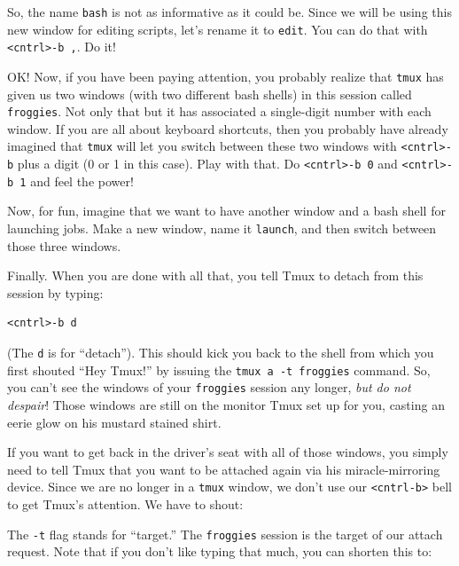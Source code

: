 \documentclass[]{krantz}
\makeatletter
\newenvironment{Shaded}{\begin{snugshade}}{\end{snugshade}}
\newcommand{\ExtensionTok}[1]{#1}
\newcommand{\NormalTok}[1]{#1}
\newenvironment{kframe}{%
\medskip{}
\setlength{\fboxsep}{.8em}
 \def\at@end@of@kframe{}%
 \ifinner\ifhmode%
  \def\at@end@of@kframe{\end{minipage}}%
  \begin{minipage}{\columnwidth}%
 \fi\fi%
 \def\FrameCommand##1{\hskip\@totalleftmargin \hskip-\fboxsep
 \colorbox{shadecolor}{##1}\hskip-\fboxsep
     \hskip-\linewidth \hskip-\@totalleftmargin \hskip\columnwidth}%
 \MakeFramed {\advance\hsize-\width
   \@totalleftmargin\z@ \linewidth\hsize
   \@setminipage}}%
 {\par\unskip\endMakeFramed%
 \at@end@of@kframe}
\renewenvironment{Shaded}{\begin{kframe}}{\end{kframe}}
\makeatother
\begin{document}
So, the name \texttt{bash} is not as informative as it could be. Since we will be using this
new window for editing scripts, let's rename it to \texttt{edit}. You can do that with
\texttt{\textless{}cntrl\textgreater{}-b\ ,}. Do it!

OK! Now, if you have been paying attention, you probably realize that \texttt{tmux} has given us
two windows (with two different bash shells) in this session called \texttt{froggies}. Not only that
but it has associated a single-digit number with each window. If you are all about keyboard
shortcuts, then you probably have already imagined that \texttt{tmux} will let you switch between
these two windows with \texttt{\textless{}cntrl\textgreater{}-b} plus a digit (0 or 1 in this case). Play with that.
Do \texttt{\textless{}cntrl\textgreater{}-b\ 0} and \texttt{\textless{}cntrl\textgreater{}-b\ 1} and feel the power!

Now, for fun, imagine that we want to have another window and a bash shell for launching
jobs. Make a new window, name it \texttt{launch}, and then switch between those three windows.

Finally. When you are done with all that, you tell Tmux to detach from this session
by typing:

\begin{verbatim}
<cntrl>-b d
\end{verbatim}

(The \texttt{d} is for ``detach''). This should kick you back to the shell from which you
first shouted ``Hey Tmux!'' by issuing the \texttt{tmux\ a\ -t\ froggies} command. So, you
can't see the windows of your \texttt{froggies} session any longer, \emph{but do not despair}!
Those windows are still on the monitor Tmux set up for you, casting an eerie glow
on his mustard stained shirt.

If you want to get back in the driver's seat with all of those windows, you simply need to
tell Tmux that you want to be attached again via his miracle-mirroring device. Since we
are no longer in a \texttt{tmux} window, we don't use our \texttt{\textless{}cntrl-b\textgreater{}} bell to get Tmux's attention.
We have to shout:

\begin{Shaded}
\begin{Highlighting}[]
\ExtensionTok{%
\end{Highlighting}
\end{Shaded}

The \texttt{-t} flag stands for ``target.'' The \texttt{froggies} session is the target of our
attach request. Note that if you don't like typing that much, you can shorten this to:
\end{document}
